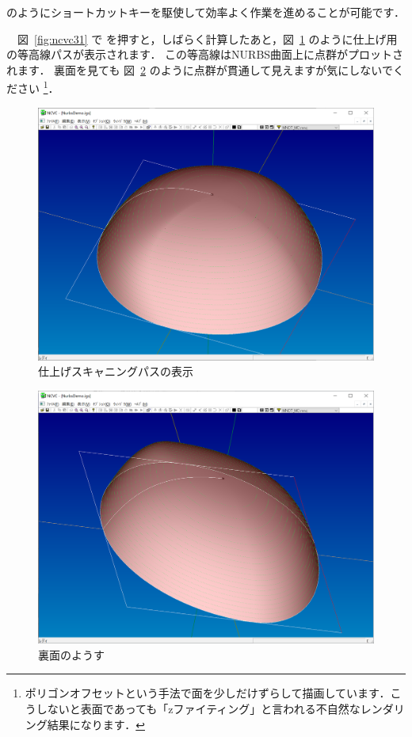 のようにショートカットキーを駆使して効率よく作業を進めることが可能です．

\vspace*{1zh}
　図~\ref{fig:ncvc31} で  を押すと，しばらく計算したあと，図~\ref{fig:ncvc32} のように仕上げ用の等高線パスが表示されます．
この等高線はNURBS曲面上に点群がプロットされます．
裏面を見ても 図~\ref{fig:ncvc33} のように点群が貫通して見えますが気にしないでください
\footnote{ポリゴンオフセットという手法で面を少しだけずらして描画しています．こうしないと表面であっても「zファイティング」と言われる不自然なレンダリング結果になります．}．

\begin{figure}[H]
\centering
\includegraphics[scale=0.5]{No3/fig/fig32.png}
\caption{仕上げスキャニングパスの表示}
\label{fig:ncvc32}
\end{figure}

\begin{figure}[H]
\centering
\includegraphics[scale=0.5]{No3/fig/fig33.png}
\caption{裏面のようす}
\label{fig:ncvc33}
\end{figure}

